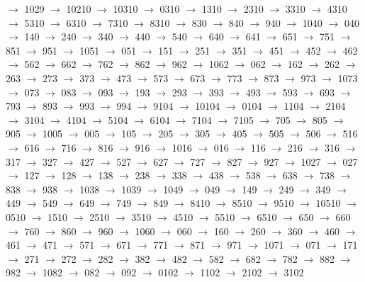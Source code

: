 $\rightarrow$ 1029 $\rightarrow$ 10210 $\rightarrow$ 10310 $\rightarrow$ 0310 $\rightarrow$ 1310 $\rightarrow$ 2310 $\rightarrow$ 3310 $\rightarrow$ 4310 $\rightarrow$ 5310 $\rightarrow$ 6310 $\rightarrow$ 7310 $\rightarrow$ 8310 $\rightarrow$ 830 $\rightarrow$ 840 $\rightarrow$ 940 $\rightarrow$ 1040 $\rightarrow$ 040 $\rightarrow$ 140 $\rightarrow$ 240 $\rightarrow$ 340 $\rightarrow$ 440 $\rightarrow$ 540 $\rightarrow$ 640 $\rightarrow$ 641 $\rightarrow$ 651 $\rightarrow$ 751 $\rightarrow$ 851 $\rightarrow$ 951 $\rightarrow$ 1051 $\rightarrow$ 051 $\rightarrow$ 151 $\rightarrow$ 251 $\rightarrow$ 351 $\rightarrow$ 451 $\rightarrow$ 452 $\rightarrow$ 462 $\rightarrow$ 562 $\rightarrow$ 662 $\rightarrow$ 762 $\rightarrow$ 862 $\rightarrow$ 962 $\rightarrow$ 1062 $\rightarrow$ 062 $\rightarrow$ 162 $\rightarrow$ 262 $\rightarrow$ 263 $\rightarrow$ 273 $\rightarrow$ 373 $\rightarrow$ 473 $\rightarrow$ 573 $\rightarrow$ 673 $\rightarrow$ 773 $\rightarrow$ 873 $\rightarrow$ 973 $\rightarrow$ 1073 $\rightarrow$ 073 $\rightarrow$ 083 $\rightarrow$ 093 $\rightarrow$ 193 $\rightarrow$ 293 $\rightarrow$ 393 $\rightarrow$ 493 $\rightarrow$ 593 $\rightarrow$ 693 $\rightarrow$ 793 $\rightarrow$ 893 $\rightarrow$ 993 $\rightarrow$ 994 $\rightarrow$ 9104 $\rightarrow$ 10104 $\rightarrow$ 0104 $\rightarrow$ 1104 $\rightarrow$ 2104 $\rightarrow$ 3104 $\rightarrow$ 4104 $\rightarrow$ 5104 $\rightarrow$ 6104 $\rightarrow$ 7104 $\rightarrow$ 7105 $\rightarrow$ 705 $\rightarrow$ 805 $\rightarrow$ 905 $\rightarrow$ 1005 $\rightarrow$ 005 $\rightarrow$ 105 $\rightarrow$ 205 $\rightarrow$ 305 $\rightarrow$ 405 $\rightarrow$ 505 $\rightarrow$ 506 $\rightarrow$ 516 $\rightarrow$ 616 $\rightarrow$ 716 $\rightarrow$ 816 $\rightarrow$ 916 $\rightarrow$ 1016 $\rightarrow$ 016 $\rightarrow$ 116 $\rightarrow$ 216 $\rightarrow$ 316 $\rightarrow$ 317 $\rightarrow$ 327 $\rightarrow$ 427 $\rightarrow$ 527 $\rightarrow$ 627 $\rightarrow$ 727 $\rightarrow$ 827 $\rightarrow$ 927 $\rightarrow$ 1027 $\rightarrow$ 027 $\rightarrow$ 127 $\rightarrow$ 128 $\rightarrow$ 138 $\rightarrow$ 238 $\rightarrow$ 338 $\rightarrow$ 438 $\rightarrow$ 538 $\rightarrow$ 638 $\rightarrow$ 738 $\rightarrow$ 838 $\rightarrow$ 938 $\rightarrow$ 1038 $\rightarrow$ 1039 $\rightarrow$ 1049 $\rightarrow$ 049 $\rightarrow$ 149 $\rightarrow$ 249 $\rightarrow$ 349 $\rightarrow$ 449 $\rightarrow$ 549 $\rightarrow$ 649 $\rightarrow$ 749 $\rightarrow$ 849 $\rightarrow$ 8410 $\rightarrow$ 8510 $\rightarrow$ 9510 $\rightarrow$ 10510 $\rightarrow$ 0510 $\rightarrow$ 1510 $\rightarrow$ 2510 $\rightarrow$ 3510 $\rightarrow$ 4510 $\rightarrow$ 5510 $\rightarrow$ 6510 $\rightarrow$ 650 $\rightarrow$ 660 $\rightarrow$ 760 $\rightarrow$ 860 $\rightarrow$ 960 $\rightarrow$ 1060 $\rightarrow$ 060 $\rightarrow$ 160 $\rightarrow$ 260 $\rightarrow$ 360 $\rightarrow$ 460 $\rightarrow$ 461 $\rightarrow$ 471 $\rightarrow$ 571 $\rightarrow$ 671 $\rightarrow$ 771 $\rightarrow$ 871 $\rightarrow$ 971 $\rightarrow$ 1071 $\rightarrow$ 071 $\rightarrow$ 171 $\rightarrow$ 271 $\rightarrow$ 272 $\rightarrow$ 282 $\rightarrow$ 382 $\rightarrow$ 482 $\rightarrow$ 582 $\rightarrow$ 682 $\rightarrow$ 782 $\rightarrow$ 882 $\rightarrow$ 982 $\rightarrow$ 1082 $\rightarrow$ 082 $\rightarrow$ 092 $\rightarrow$ 0102 $\rightarrow$ 1102 $\rightarrow$ 2102 $\rightarrow$ 3102 